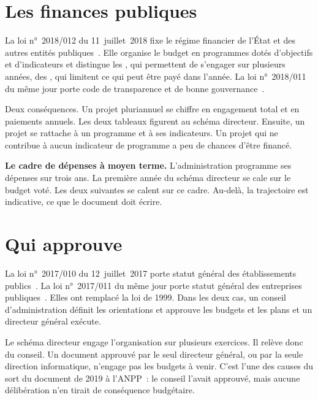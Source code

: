 \section{Les finances publiques}
\label{sec:c07-finances}

La loi n°~2018/012 du 11~juillet~2018 fixe le régime financier de l'État et des autres entités
publiques~\cite{loi2018012}. Elle organise le budget en programmes dotés d'objectifs et d'indicateurs et
distingue les , qui permettent de s'engager sur plusieurs années, des
, qui limitent ce qui peut être payé dans l'année. La loi n°~2018/011 du même jour
porte code de transparence et de bonne gouvernance~\cite{loi2018011}.

Deux conséquences. Un projet pluriannuel se chiffre en engagement total et en paiements annuels. Les deux
tableaux figurent au schéma directeur. Ensuite, un projet se rattache à un programme et à ses indicateurs. Un
projet qui ne contribue à aucun indicateur de programme a peu de chances d'être financé.

\begin{boxinfo}
\textbf{Le cadre de dépenses à moyen terme.} L'administration programme ses dépenses sur trois ans. La première
année du schéma directeur se cale sur le budget voté. Les deux suivantes se calent sur ce cadre. Au-delà, la
trajectoire est indicative, ce que le document doit écrire.
\end{boxinfo}

\section{Qui approuve}
\label{sec:c07-organes}

La loi n°~2017/010 du 12~juillet~2017 porte statut général des établissements publics~\cite{loi2017010}. La loi
n°~2017/011 du même jour porte statut général des entreprises publiques~\cite{loi2017011}. Elles ont remplacé la
loi de 1999. Dans les deux cas, un conseil d'administration définit les orientations et approuve les budgets et
les plans et un directeur général exécute.

Le schéma directeur engage l'organisation sur plusieurs exercices. Il relève donc du conseil. Un document
approuvé par le seul directeur général, ou par la seule direction informatique, n'engage pas les budgets à
venir. C'est l'une des causes du sort du document de 2019 à l'ANPP~: le conseil l'avait approuvé, mais aucune
délibération n'en tirait de conséquence budgétaire.

